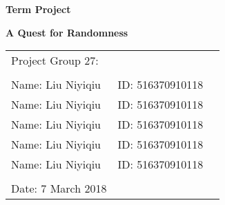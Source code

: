 \documentclass[12pt,a4paper]{article}
\begin{document}
\vspace*{0.25cm}

\hrulefill

\thispagestyle{empty}

\begin{center}
\begin{large}
\end{large}

\hrulefill

\vspace*{5cm}
\begin{Large}
\textbf{{Term Project \uppercase\expandafter{}}}
\end{Large}

\vspace{2em}

\begin{large}
\textbf{A Quest for Randomness\\
\vspace{0.8em}
 }
\end{large}
\end{center}


\vfill

\begin{table}[h!]
\flushleft
\begin{tabular}{lll}
Project Group 27: & \\
&\\
Name: Liu Niyiqiu \hspace*{2em}&
ID: 516370910118\hspace*{2em}
\\
Name: Liu Niyiqiu \hspace*{2em}&
ID: 516370910118\hspace*{2em}
\\
Name: Liu Niyiqiu \hspace*{2em}&
ID: 516370910118\hspace*{2em}
\\
Name: Liu Niyiqiu \hspace*{2em}&
ID: 516370910118\hspace*{2em}
\\
Name: Liu Niyiqiu \hspace*{2em}&
ID: 516370910118\hspace*{2em}
\\


\\

Date: 7 March 2018
\end{tabular}
\end{table}
\end{document}
